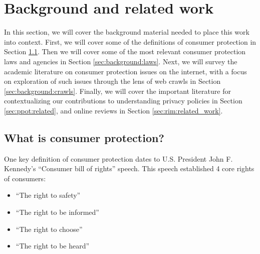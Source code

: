 \chapter{Background and related work} \label{ch:background}

In this section, we will cover the background material needed to place this work into context. First, we will cover some of the definitions of consumer protection in Section \ref{sec:background:definition}. Then we will cover some of the most relevant consumer protection laws and agencies in Section \ref{sec:background:laws}. Next, we will survey the academic literature on consumer protection issues on the internet, with a focus on exploration of such issues through the lens of web crawls in Section \ref{sec:background:crawls}. Finally, we will cover the important literature for contextualizing our contributions to understanding privacy policies in Section \ref{sec:ppot:related}, and online reviews in Section \ref{sec:rim:related_work}.


\section{What is consumer protection?} \label{sec:background:definition}

One key definition of consumer protection dates to U.S. President John F. Kennedy's ``Consumer bill of rights'' speech. This speech established 4 core rights of consumers: \cite{kennedy1962special}
\begin{itemize}
\item ``The right to safety''
\item ``The right to be informed''
\item ``The right to choose''
\item ``The right to be heard''
\end{itemize}


